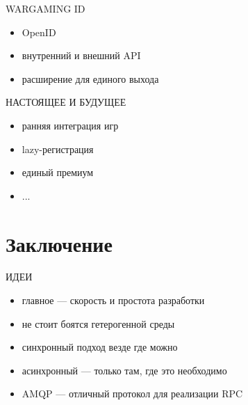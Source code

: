 \documentclass[aspectratio=169]{beamer}
\begin{document}
\begin{frame}{WARGAMING ID}
    \begin{itemize}
        \item OpenID
        \item внутренний и внешний API
        \item расширение для единого выхода
    \end{itemize}
\end{frame}

\begin{frame}{НАСТОЯЩЕЕ И БУДУЩЕЕ}
    \begin{itemize}
        \item ранняя интеграция игр
        \item lazy-регистрация
        \item единый премиум
        \item ...
    \end{itemize}
\end{frame}

\section{Заключение}
{
\begin{frame}[plain]{}
\end{frame}
}

\begin{frame}{ИДЕИ}
    \begin{itemize}
        \item главное --- скорость и простота разработки
        \item не стоит боятся гетерогенной среды
        \item синхронный подход везде где можно
        \item асинхронный --- только там, где это необходимо
        \item AMQP --- отличный протокол для реализации RPC
    \end{itemize}
\end{frame}
\end{document}
